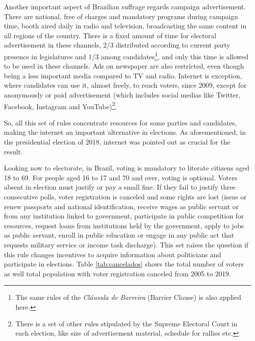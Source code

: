 \documentclass[
  12pt,
]{article}
\begin{document}
Another important aspect of Brazilian suffrage regards campaign
advertisement. There are national, free of charges and mandatory
programs during campaign time, booth aired daily in radio and
television, broadcasting the same content in all regions of the country.
There is a fixed amount of time for electoral advertisement in these
channels, 2/3 distributed according to current party presence in
legislatures and 1/3 among candidates\footnote{The same rules of the
  \emph{Cláusula de Barreira} (Barrier Clause) is also applied here.},
and only this time is allowed to be used in these channels. Ads on
newspaper are also restricted, even though being a less important media
compared to TV and radio. Internet is exception, where candidates can
use it, almost freely, to reach voters, since 2009, except for
anonymously or paid advertisement (which includes social medias like
Twitter, Facebook, Instagram and YouTube)\footnote{There is a set of
  other rules stipulated by the Supreme Electoral Court in each
  election, like size of advertisement material, schedule for rallies
  etc.}.

So, all this set of rules concentrate resources for some parties and
candidates, making the internet an important alternative in elections.
As aforementioned, in the presidential election of 2018, internet was
pointed out as crucial for the result.

Looking now to electorate, in Brazil, voting is mandatory to literate
citizens aged 18 to 69. For people aged 16 to 17 and 70 and over, voting
is optional. Voters absent in election must justify or pay a small fine.
If they fail to justify three consecutive polls, voter registration is
canceled and some rights are lost (issue or renew passports and national
identification, receive wages as public servant or from any institution
linked to government, participate in public competition for resources,
request loans from institutions held by the government, apply to jobs as
public servant, enroll in public education or engage in any public act
that requests military service or income task discharge). This set
raises the question if this rule changes incentives to acquire
information about politicians and participate in elections. Table
\ref{tab:cancelados} shows the total number of voters as well total
population with voter registration canceled from 2005 to 2019.
\end{document}
